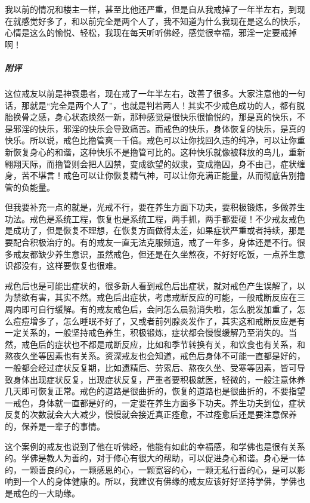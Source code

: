 \begin{case}
    我以前的情况和楼主一样，甚至比他还严重，但是自从我戒掉了一年半左右，到现在就感觉好多了，和以前完全是两个人了，我不知道为什么我现在是这么的快乐，心情是这么的愉悦、轻松，我现在每天听听佛经，感觉很幸福，邪淫一定要戒掉啊！
    \subparagraph{附评} 这位戒友以前是神衰患者，现在戒了一年半左右，改善了很多。大家注意他的一句话，那就是“完全是两个人了”，也就是判若两人！其实不少戒色成功的人，都有脱胎换骨之感，身心状态焕然一新，那种感觉是很快乐很愉悦的，那是真的快乐，不是邪淫的快乐，邪淫的快乐会导致痛苦。而戒色的快乐，身体恢复的快乐，是真的快乐。所以说，戒色比撸管爽一千倍。戒色可以让你找回久违的纯净，可以让你重新恢复身心的和谐，这种快乐不是撸管可比的。这种快乐就像被释放的鸟儿，重新翱翔天际，而撸管则会把人囚禁，变成欲望的奴隶，变成撸囚，身不由己，症状缠身，苦不堪言！戒色可以让你恢复精气神，可以让你充满正能量，从而彻底告别撸管的负能量。

    但我要补充一点的就是，光戒不行，要在养生方面下功夫，要积极锻炼，多做养生功法。戒色是系统工程，恢复也是系统工程，两手抓，两手都要硬！不少戒友戒色是成功了，但是恢复不理想，在恢复方面做得太差，如果症状严重或者持续，那是要配合积极治疗的。有的戒友一直无法克服频遗，戒了一年多，身体还是不行。很多戒友都缺少养生意识，虽然戒色，但还是在久坐熬夜，不好好吃饭，一点养生意识都没有，这样要恢复也很难。

    戒色后也是可能出症状的，很多新人看到戒色后出症状，就对戒色产生误解了，以为禁欲有害，其实不然。戒色后出症状，考虑戒断反应的可能，一般戒断反应在三周内即可自行缓解。有的戒友戒色后，会问怎么晨勃消失啦，怎么脱发加重了，怎么痘痘增多了，怎么睡眠不好了，又或者前列腺炎发作了，其实这和戒断反应是有一定关系的，一般坚持戒色养生，积极锻炼，症状都会慢慢缓解乃至消失的。当然，戒色后的症状也不都是戒断反应，比如和季节转换有关，和饮食也有关系，和熬夜久坐等因素也有关系。资深戒友也会知道，戒色后身体不可能一直都是好的，一般都会经过症状反复期，比如遗精后、劳累后、熬夜久坐、受寒等因素，皆可导致身体出现症状反复，出现症状反复，严重者要积极就医，轻微的，一般注意休养几天即可恢复正常。戒色的道路是很曲折的，恢复的道路也是很曲折的，不要指望一戒色，身体就一直都是好的，一定要在养生方面多下功夫。养生功夫到位，症状反复的次数就会大大减少，慢慢就会接近真正痊愈，不过痊愈后还是要注意保养的，保养是一辈子的事情。

    这个案例的戒友也说到了他在听佛经，他能有如此的幸福感，和学佛也是很有关系的。学佛是教人为善的，对于修心有很大的帮助，可以促进身心和谐。身心是一体的，一颗善良的心，一颗感恩的心，一颗宽容的心，一颗无私行善的心，是可以影响到一个人的身体健康的。所以，我建议有佛缘的戒友应该好好坚持学佛，学佛也是戒色的一大助缘。
\end{case}

